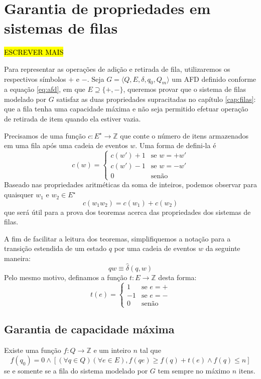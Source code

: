 \chapter{Garantia de propriedades em sistemas de filas}

\hl{ESCREVER MAIS}

Para representar as operações de adição e retirada de fila, utilizaremos os respectivos símbolos $+$ e $-$. Seja $G = \langle Q, E, \delta, q_0, Q_m \rangle$ um AFD definido conforme a equação \ref{eq:afd}, em que $E \supseteq \{ +, - \}$, queremos provar que o sistema de filas modelado por $G$ satisfaz as duas propriedades supracitadas no capítulo \ref{cap:filas}: que a fila tenha uma capacidade máxima e não seja permitido efetuar operação de retirada de item quando ela estiver vazia.

Precisamos de uma função $c : E^\star \to \mathbb{Z}$ que conte o número de itens armazenados em uma fila após uma cadeia de eventos $w$. Uma forma de defini-la é $$c(w) = \begin{cases}
c(w') + 1 & \text{se $w=+w'$}\\
c(w') - 1 & \text{se $w=-w'$}\\
0 & \text{senão}
\end{cases}$$ Baseado nas propriedades aritméticas da soma de inteiros, podemos observar para quaisquer $w_1$ e $w_2 \in E^\star$ $$c(w_1w_2) = c(w_1) + c(w_2)$$ que será útil para a prova dos teoremas acerca das propriedades dos sistemas de filas.

A fim de facilitar a leitura dos teoremas, simplifiquemos a notação para a transição estendida de um estado $q$ por uma cadeia de eventos $w$ da seguinte maneira: $$qw \equiv \hat{\delta}(q,w)$$ Pelo mesmo motivo, definamos a função $t : E \to \mathbb{Z}$ desta forma: $$t(e) = \begin{cases}
1 & \text{se $e=+$} \\
-1 & \text{se $e=-$} \\
0 & \text{senão}
\end{cases}$$

\section{Garantia de capacidade máxima}

\begin{teo}
	\label{teo:teo1}
	Existe uma função $f : Q \to \mathbb{Z}$ e um inteiro $n$ tal que \begin{equation*}
	f(q_0) = 0 \wedge [(\forall q \in Q)(\forall e \in E), f(qe) \geq f(q) + t(e) \wedge f(q) \leq n]
	\end{equation*} se e somente se a fila do sistema modelado por $G$ tem sempre no máximo $n$ itens.
\end{teo}

